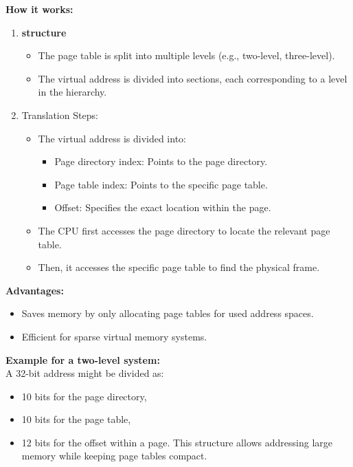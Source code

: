 \documentclass{article}
\begin{document}
{\bf How it works:}
\begin{enumerate}
    \item {\bf structure}
    \begin{itemize}
        \item The page table is split into multiple levels (e.g., two-level, three-level).
        \item The virtual address is divided into sections, each corresponding to a level in the hierarchy.
    \end{itemize}
    \item Translation Steps:
    \begin{itemize}
        \item The virtual address is divided into: \begin{itemize}
            \item Page directory index: Points to the page directory.
            \item Page table index: Points to the specific page table.
            \item Offset: Specifies the exact location within the page.
        \end{itemize}
    \item The CPU first accesses the page directory to locate the relevant page table.
    \item Then, it accesses the specific page table to find the physical frame.
    \end{itemize}
\end{enumerate}

{\bf Advantages:}
\begin{itemize}
    \item Saves memory by only allocating page tables for used address spaces.
    \item Efficient for sparse virtual memory systems.
\end{itemize}

{\bf Example for a two-level system:} 
\\
A 32-bit address might be divided as: 
\begin{itemize}
    \item 10 bits for the page directory,
    \item 10 bits for the page table,
    \item 12 bits for the offset within a page.
    This structure allows addressing large memory while keeping page tables compact.
\end{itemize}
\end{document}
